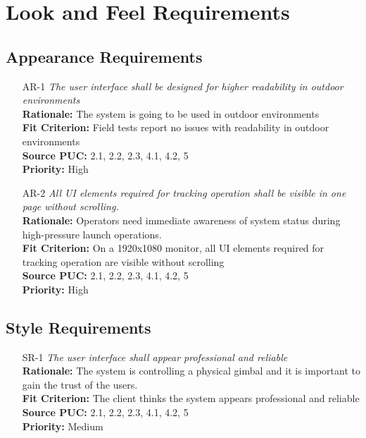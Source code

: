 \documentclass[12pt]{article}
\begin{document}
\section{Look and Feel Requirements}
\subsection{Appearance Requirements}
\begin{itemize}[leftmargin=*]
  \item[AR-1] \emph{The user interface shall be designed for higher readability in
          outdoor environments}\\[2mm]
        \textbf{Rationale:} The system is going to be used in outdoor environments\\
        \textbf{Fit Criterion:} Field tests report no issues with readability in outdoor environments\\
        \textbf{Source PUC:} 2.1, 2.2, 2.3, 4.1, 4.2, 5 \\
        \textbf{Priority:} High

  \item[AR-2] \emph{All UI elements required for tracking operation shall be visible in
          one page without scrolling.}\\[2mm]
        \textbf{Rationale:} Operators need immediate awareness of system
        status during high-pressure launch operations.\\
        \textbf{Fit Criterion:} On a 1920x1080 monitor, all UI elements required for tracking operation are visible without scrolling\\
        \textbf{Source PUC:} 2.1, 2.2, 2.3, 4.1, 4.2, 5 \\
        \textbf{Priority:} High
\end{itemize}

\subsection{Style Requirements}
\begin{itemize}[leftmargin=*]
  \item[SR-1] \emph{The user interface shall appear professional and reliable}\\[2mm]
        \textbf{Rationale:} The system is controlling a physical gimbal and it is important to gain the trust of the users.\\
        \textbf{Fit Criterion:} The client thinks the system appears professional and reliable\\
        \textbf{Source PUC:} 2.1, 2.2, 2.3, 4.1, 4.2, 5 \\
        \textbf{Priority:} Medium
\end{itemize}
\end{document}
